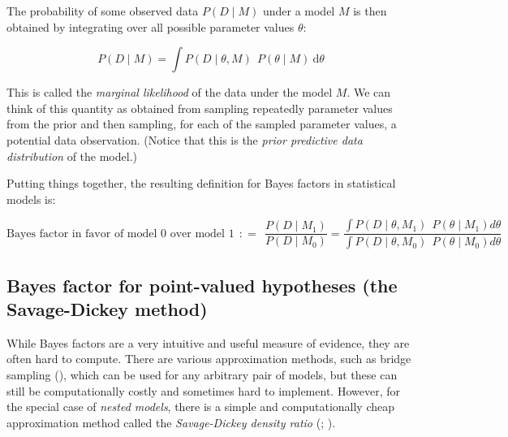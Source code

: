 \documentclass[
  doc,
  floatsintext,
  longtable,
  nolmodern,
  notxfonts,
  notimes,
  colorlinks=true,linkcolor=blue,citecolor=blue,urlcolor=blue]{apa7}
\begin{document}
The probability of some observed data \(P(D \mid M)\) under a model
\(M\) is then obtained by integrating over all possible parameter values
\(\theta\):

\[
P(D \mid M) = \int P(D \mid \theta, M) \ \  P(\theta \mid M) \ \text{d} \theta
\]

This is called the \emph{marginal likelihood} of the data under the
model \(M\). We can think of this quantity as obtained from sampling
repeatedly parameter values from the prior and then sampling, for each
of the sampled parameter values, a potential data observation. (Notice
that this is the \emph{prior predictive data distribution} of the
model.)

Putting things together, the resulting definition for Bayes factors in
statistical models is:

\[
\text{Bayes factor in favor of model 0 over model 1} \ \  \colon\!= \ \ \frac{P(D \mid M_1)}{P(D \mid M_0)} = \frac{\int P(D \mid \theta, M_1) \ \  P(\theta \mid M_1) d\theta}{\int P(D \mid \theta, M_0) \ \  P(\theta \mid M_0) d\theta}
\]

\subsection{Bayes factor for point-valued hypotheses (the Savage-Dickey
method)}\label{bayes-factor-for-point-valued-hypotheses-the-savage-dickey-method}

While Bayes factors are a very intuitive and useful measure of evidence,
they are often hard to compute. There are various approximation methods,
such as bridge sampling
(), which can be used for any arbitrary pair of models, but these
can still be computationally costly and sometimes hard to implement.
However, for the special case of \emph{nested models}, there is a simple
and computationally cheap approximation method called the
\emph{Savage-Dickey density ratio}
(;
).
\end{document}

